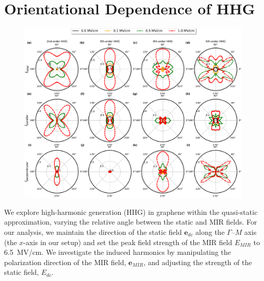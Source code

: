 \section{Orientational Dependence of HHG}
\begin{figure}[tp]
	\centering
	\includegraphics[width=1.0\linewidth]{pic/polar.pdf}
	\caption{
	}\label{fig:polar}
\end{figure}

We explore high-harmonic generation (HHG) in graphene within the quasi-static approximation, varying the relative angle between the static and MIR fields. For our analysis, we maintain the direction of the static field $\mathbf e_{dc}$ along the $\Gamma$--$M$ axis (the $x$-axis in our setup) and set the peak field strength of the MIR field $E_{MIR}$ to 6.5~MV/cm. We investigate the induced harmonics by manipulating the polarization direction of the MIR field, $\mathbf e_{MIR}$, and adjusting the strength of the static field, $E_{dc}$.


